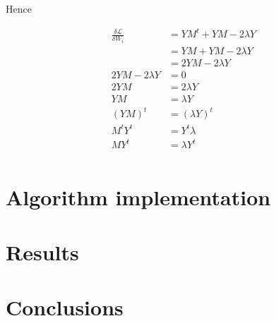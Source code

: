 \documentclass[12pt,journal]{IEEEtran}
\begin{document}
    Hence

    \begin{equation*}
        \begin{aligned}
            \frac{\delta \mathcal{L}}{\delta W_i} &= Y M^t + Y M - 2 \lambda Y\\
                                                  &= Y M + Y M - 2 \lambda Y\\
                                                  &= 2 Y M - 2 \lambda Y \\
                              2 Y M - 2 \lambda Y &= 0 \\
                                            2 Y M &= 2 \lambda Y \\
                                              Y M &= \lambda Y \\
                                              (Y M)^t &= (\lambda Y)^t \\
                                              M^t Y^t &= Y^t \lambda \\
                                              M Y^t &= \lambda Y^t \\
        \end{aligned}
    \end{equation*}


\section{Algorithm implementation}

\section{Results}

\section{Conclusions}
\end{document}
